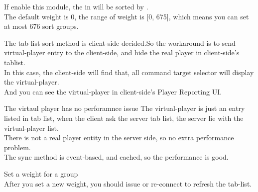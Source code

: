 
If enable this module, the  in  will be sorted by .
\\
The default weight is 0, the range of weight is [0, 675], which means you can set at most 676 sort groups.

The tab list sort method is client-side decided.So the workaround is to send virtual-player entry to the client-side, and hide the real player in client-side's tablist.
\\
In this case, the client-side will find that, all command target selector will display the virtual-player.
\\
And you can see the virtual-player in client-side's Player Reporting UI.

\begin{note}{The virtaul player has no perforamnce issue}
    The virtual-player is just an entry listed in tab list, when the client ask the server tab list, the server lie with the virtual-player list.
    \\
    There is not a real player entity in the server side, so no extra performance problem.
    \\
    The sync method is event-based, and cached, so the performance is good.
\end{note}

\begin{example}{Set a weight for a group}
    \\
    After you set a new weight, you should issue  or re-connect to refresh the tab-list.
\end{example}



